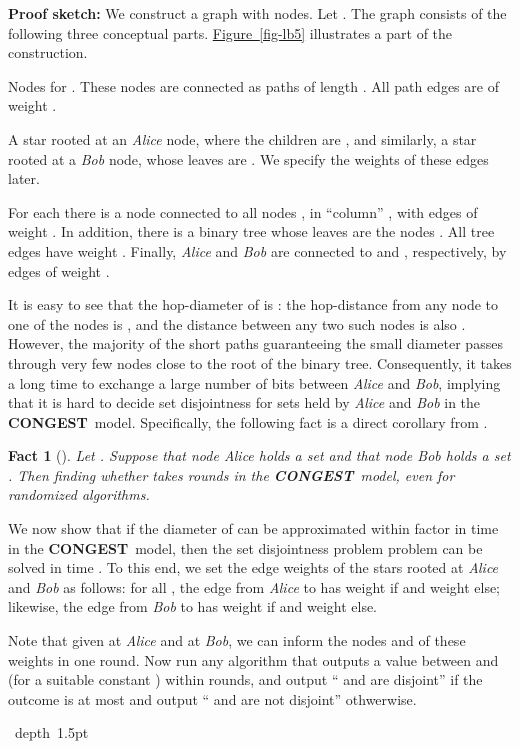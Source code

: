 \documentclass[letterpaper,11pt]{article}
\newcommand{\namedref}[2]{\hyperref[#2]{#1~\ref*{#2}}}
\newcommand{\figref}[1]{\namedref{Figure}{#1}}
\newtheorem{fact}{Fact}[section]
\newcommand{\blackslug}{\hbox{\hskip 1pt \vrule width 4pt height 8pt
depth 1.5pt \hskip 1pt}}
\newcommand{\QED}{\quad\blackslug\lower 8.5pt\null\par}
\newenvironment{proof}[1][Proof:]{\noindent \textbf{#1}\xspace}{\QED}
\newcommand{\CONGEST}{\textbf{CONGEST}}
\begin{document}
\begin{proof}[Proof sketch:]
  We construct a graph  with  nodes. Let . The
  graph consists of the following three conceptual parts. \figref{fig-lb5}
  illustrates a part of the construction.
  \begin{compactitem}
  \item Nodes  for . These nodes are connected
    as  paths of length . All path edges are of weight .
  \item A star rooted at an \emph{Alice} node, where the children are
  , and similarly, a star rooted at a \emph{Bob} node,
  whose leaves are . We specify the weights of these
  edges later.
   \item For each  there is a node  connected to all
     nodes ,  in ``column'' , with edges of
     weight . In addition, there is a binary tree whose
     leaves are the nodes . All tree edges have weight . Finally, \emph{Alice}
     and \emph{Bob} are connected to  and , respectively, by edges of weight
     .
  \end{compactitem}
It is easy to see that the hop-diameter of  is :
the hop-distance from any node to one of the nodes  is ,
and the distance between any two such nodes is also .
However, the majority of the short paths guaranteeing the small diameter passes
through very few nodes close to the root of the binary tree. Consequently, it
takes a long time to exchange a large number of bits between \emph{Alice} and \emph{Bob}, implying
that it is hard to decide set disjointness for sets held
by \emph{Alice} and \emph{Bob} in the \CONGEST\ model. Specifically, the following fact is a
direct corollary from \cite{DHKNPPW-11}.
\begin{fact}[\cite{DHKNPPW-11}]
\label{lb-fact}
Let . Suppose that node \emph{Alice}
holds a set  and that node \emph{Bob} holds a set
. Then finding whether  takes
 rounds in the \CONGEST\ model, even for randomized algorithms.  
\end{fact}

We now show that if the diameter of  can be approximated within factor
 in time  in the \CONGEST\ model, then the set
disjointness problem problem can be solved in time . To this end, we set
the edge weights of the stars rooted at \emph{Alice} and \emph{Bob} as follows: for all , the edge from \emph{Alice} to  has weight  if
 and weight  else; likewise, the edge from \emph{Bob} to  has
weight  if  and weight  else.

Note that given  at \emph{Alice} and  at \emph{Bob}, we can inform the nodes 
and  of these weights in one round. Now run any algorithm that outputs
a value between  and 
(for a suitable constant ) within  rounds, and output `` and  are
disjoint'' if the outcome is at most  and output `` and 
are not disjoint'' othwerwise.


\end{proof}
\end{document}
